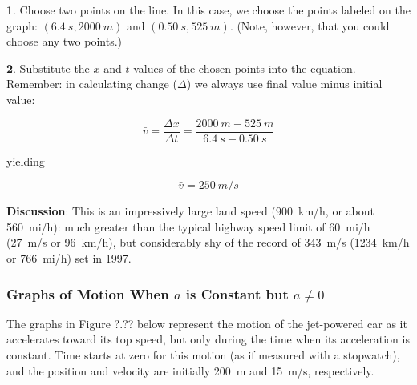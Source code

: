 \documentclass[main-ap-physics.tex]{subfiles}
\begin{document}
\vspace{1em}

\textbf{1}. Choose two points on the line. In this case, we choose the points labeled on the graph: $\left(\SI{6.4}{s}, \SI{2000}{m}\right)$ and $\left(\SI{0.50}{s}, \SI{525}{m}\right)$. (Note, however, that you could choose any two points.)

\vspace{1em}

\textbf{2}. Substitute the $x$ and $t$ values of the chosen points into the equation. Remember: in calculating change ($\Delta$) we always use final value minus initial value:

\begin{equation*}
    \bar{v} = \frac{\Delta x}{\Delta t} = \frac{\SI{2000}{m} - 
    \SI{525}{m}}{\SI{6.4}{s} - \SI{0.50}{s}}
\end{equation*}

yielding

\begin{equation*}
    \bar{v} = \SI{250}{m/s}
\end{equation*}

\textbf{Discussion}: This is an impressively large land speed (\SI{900}{km/h}, or about \SI{560}{mi/h}): much greater than the typical highway speed limit of \SI{60}{mi/h} (\SI{27}{m/s} or \SI{96}{km/h}), but considerably shy of the record of \SI{343}{m/s} (\SI{1234}{km/h} or \SI{766}{mi/h}) set in 1997.

\endsolution

\subsubsection*{Graphs of Motion When $a$ is Constant but $a \neq 0$}

The graphs in Figure ?.?? below represent the motion of the jet-powered car as it accelerates toward its top speed, but only during the time when its acceleration is constant. Time starts at zero for this motion (as if measured with a stopwatch), and the position and velocity are initially \SI{200}{m} and \SI{15}{m/s}, respectively.
\end{document}
